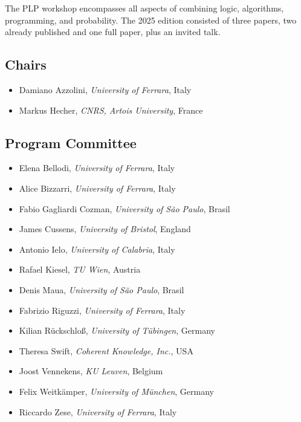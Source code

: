 \documentclass[
]{ceurart}
\begin{document}

\noindent
The PLP workshop encompasses all aspects of combining logic, algorithms, programming, and probability. The 2025 edition consisted of three papers, two already published and one full paper, plus an invited talk.

\subsection*{Chairs}
\begin{itemize}
  \item Damiano Azzolini, \emph{University of Ferrara}, Italy
  \item Markus Hecher, \emph{CNRS, Artois University}, France
\end{itemize}


\subsection*{Program Committee}
\begin{itemize}
  \item Elena Bellodi, \emph{University of Ferrara}, Italy
  \item Alice Bizzarri, \emph{University of Ferrara}, Italy
  \item Fabio Gagliardi Cozman, \emph{University of São Paulo}, Brasil
  \item James Cussens, \emph{University of Bristol}, England
  \item Antonio Ielo, \emph{University of Calabria}, Italy
  \item Rafael Kiesel, \emph{TU Wien}, Austria
  \item Denis Maua, \emph{University of São Paulo}, Brasil
  \item Fabrizio Riguzzi, \emph{University of Ferrara}, Italy
  \item Kilian Rückschloß, \emph{University of Tübingen}, Germany
  \item Theresa Swift, \emph{Coherent Knowledge, Inc.}, USA
  \item Joost Vennekens, \emph{KU Leuven}, Belgium
  \item Felix Weitkämper, \emph{University of München}, Germany
  \item Riccardo Zese, \emph{University of Ferrara}, Italy
\end{itemize}

\end{document}
